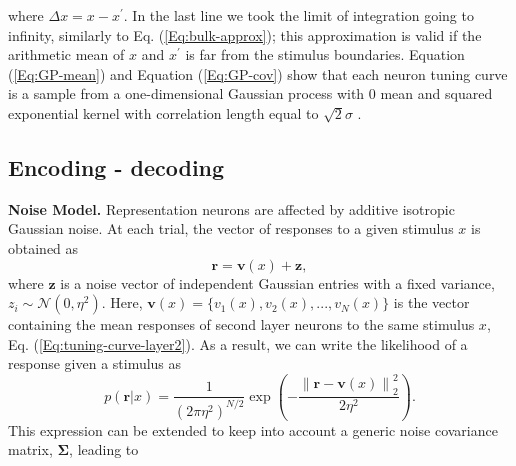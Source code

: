 \documentclass[a4paper]{article}%
\begin{document}
where $\Delta x = x -x^{\prime}$. In the last line we took the limit of
integration going to infinity, similarly to Eq. (\ref{Eq:bulk-approx}); this
approximation is valid if the arithmetic mean of  $x$ and $x^{\prime}$ is far from the
stimulus boundaries.
Equation (\ref{Eq:GP-mean}) and Equation (\ref{Eq:GP-cov}) show that each
neuron tuning curve is a sample from a one-dimensional Gaussian process with 0
mean and squared exponential kernel with correlation length equal to $\sqrt
{2}\sigma$ \cite{Rasmussen2004GaussianLearning}. \newline\newline

\subsection*{Encoding - decoding}

\textbf{Noise Model.} Representation neurons are affected by additive
isotropic Gaussian noise. At each trial, the vector of responses to a given
stimulus $x$ is obtained as
\begin{equation}
\mathbf{r} = \mathbf{v}(x) + \mathbf{z }, \label{Eq:r}%
\end{equation}
where $\mathbf{z}$ is a noise vector of independent Gaussian entries with a
fixed variance, $z_{i} \sim\mathcal{N}(0,\eta^{2})$. Here, $\mathbf{v}(x) =
\{v_{1}(x),v_{2}(x),...,v_{N}(x)\}$ is the vector containing the mean
responses of second layer neurons to the same stimulus $x$, Eq.
(\ref{Eq:tuning-curve-layer2}). As a result, we can write the likelihood of a
response given a stimulus as
\begin{equation}
p\left(  \mathbf{r}|x\right)  = \frac{1}{\left(  2\pi\eta^{2}\right)  ^{N/2}}
\exp\left(  - \frac{\left\|  \mathbf{r}-\mathbf{v}(x)\right\|  _{2}^{2}}
{2\eta^{2}} \right)  . \label{Eq:L}%
\end{equation}
This expression can be extended to keep into account a generic noise covariance matrix, 
$\bm{\Sigma}$, leading to
\end{document}
